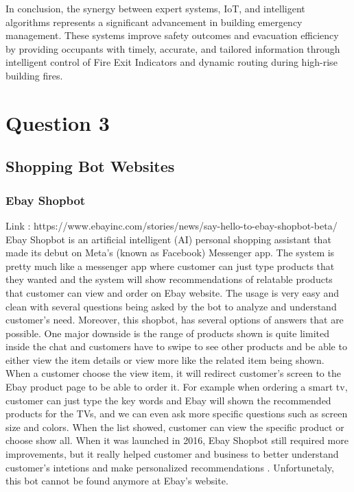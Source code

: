 \documentclass[12pt,a4paper]{article}
\begin{document}
\noindent In conclusion, the synergy between expert systems, IoT, and intelligent algorithms represents a significant advancement in building emergency management. These systems improve safety outcomes and evacuation efficiency by providing occupants with timely, accurate, and tailored information through intelligent control of Fire Exit Indicators and dynamic routing during high-rise building fires.\\




\pagebreak


\setcounter{page}{5}
\section{Question 3}
\subsection{Shopping Bot Websites}


\subsubsection{Ebay Shopbot} 
\noindent Link : https://www.ebayinc.com/stories/news/say-hello-to-ebay-shopbot-beta/\\
\noindent Ebay Shopbot is an artificial intelligent (AI) personal shopping assistant that made its debut on Meta’s (known as Facebook) Messenger app. The system is pretty much like a messenger app where customer can just type products that they wanted and the system will show recommendations of relatable products that customer can view and order on Ebay website. The usage is very easy and clean with several questions being asked by the bot to analyze and understand customer’s need. Moreover, this shopbot, has several options of answers that are possible. One major downside is the range of products shown is quite limited inside the chat and customers have to swipe to see other products and be able to either view the item details or view more like the related item being shown. When a customer choose the view item, it will redirect customer’s screen to the Ebay product page to be able to order it. For example when ordering a smart tv, customer can just type the key words and Ebay will shown the recommended products for the TVs, and we can even ask more specific questions such as screen size and colors. When the list showed, customer can view the specific product or choose show all. When it was launched in 2016, Ebay Shopbot still required more improvements, but it really helped customer and business to better understand customer’s intetions and make personalized recommendations \citep{question_3.1}. Unfortunetaly, this bot cannot be found anymore at Ebay’s website.\\
\end{document}
